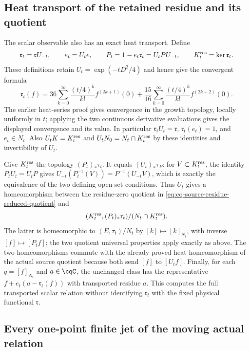 \subsection{Heat transport of the retained residue and its quotient}
The scalar observable also has an exact heat transport. Define
\[
 \mathfrak r_t=\mathfrak r U_{-t},\qquad
 e_t=U_te,\qquad
 P_t=1-e_t\mathfrak r_t=U_tPU_{-t},\qquad
 K_t^{\rm res}=\ker\mathfrak r_t .
\]
These definitions retain $U_t=\exp(-tD^2/4)$ and hence
give the convergent formula
\begin{equation}
 \mathfrak r_t(f)
 =36\sum_{k=0}^{\infty}\frac{(t/4)^k}{k!}
       f^{(2k+1)}(0)
  +\frac{15}{16}\sum_{k=0}^{\infty}\frac{(t/4)^k}{k!}
       f^{(2k+2)}(0).
 \label{eq:cq-transported-spatial-residue}
\end{equation}
The earlier heat-series proof gives convergence in the growth
topology, locally uniformly in $t$; applying the two continuous
derivative evaluations gives the displayed convergence and
its value. In particular
$\mathfrak r_tU_t=\mathfrak r$,
$\mathfrak r_t(e_t)=1$, and $e_t\in N_t$.
Also $U_tK=K_t^{\rm res}$ and
$U_tN_0=N_t\cap K_t^{\rm res}$ by these identities and
invertibility of $U_t$.

Give $K_t^{\rm res}$ the topology $(P_t)_*\tau_t$.
It equals $(U_t)_*\tau_P$: for $V\subset K_t^{\rm res}$,
the identity $P_tU_t=U_tP$ gives
$U_{-t}(P_t^{-1}(V))=P^{-1}(U_{-t}V)$,
which is exactly the equivalence of the two defining open-set
conditions. Thus $U_t$ gives a homeomorphism between the
residue-zero quotient in
\eqref{eq:cq-source-residue-reduced-quotient} and
\[
 (K_t^{\rm res},(P_t)_*\tau_t)/
       (N_t\cap K_t^{\rm res}) .
\]
The latter is homeomorphic to $(E,\tau_t)/N_t$ by
$[k]\mapsto[k]_{N_t}$, with inverse $[f]\mapsto[P_tf]$;
the two quotient universal properties apply exactly as above.
The two homeomorphisms commute with the already proved heat
homeomorphism of the actual source quotient because both send
$[f]$ to $[U_tf]$. Finally, for each $q=[f]_{N_t}$ and
$a\in\cqC$, the unchanged class has the representative
$f+e_t(a-\mathfrak r_t(f))$ with transported residue $a$.
This computes the full transported scalar relation without
identifying $\mathfrak r_t$ with the fixed physical functional
$\mathfrak r$.

\subsection{Every one-point finite jet of the moving actual relation}
\label{sec:cq-moving-finite-jets}

